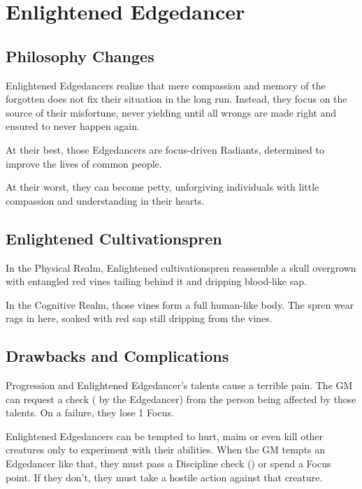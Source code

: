 \newpage
\section{Enlightened Edgedancer}


\subsection{Philosophy Changes}

Enlightened Edgedancers realize that mere compassion and memory of the forgotten does not fix their situation in the long run. Instead, they focus on the source of their misfortune, never yielding until all wrongs are made right and ensured to never happen again.

At their best, those Edgedancers are focus-driven Radiants, determined to improve the lives of common people.

At their worst, they can become petty, unforgiving individuals with little compassion and understanding in their hearts.

\subsection{Enlightened Cultivationspren}

In the Physical Realm, Enlightened cultivationspren reassemble a skull overgrown with entangled red vines tailing behind it and dripping blood-like sap.

In the Cognitive Realm, those vines form a full human-like body. The spren wear rags in here, soaked with red sap still dripping from the vines.

\subsection{Drawbacks and Complications}

Progression and Enlightened Edgedancer's talents cause a terrible pain. The GM can request a \skillDiscipline{} check (\corruptedResistanceDC{} by the Edgedancer) from the person being affected by those talents. On a failure, they lose 1 Focus.

Enlightened Edgedancers can be tempted to hurt, maim or even kill other creatures only to experiment with their abilities. When the GM tempts an Edgedancer like that, they must pass a Discipline check (\corruptedResistanceDC{}) or spend a Focus point. If they don't, they must take a hostile action against that creature.

